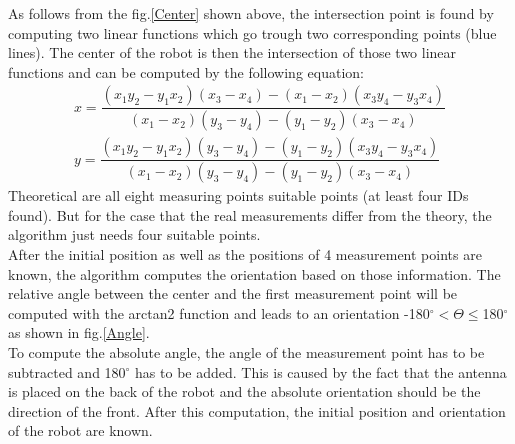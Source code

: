 As follows from the fig.\ref{Center} shown above, the intersection point is found by computing two linear functions which go trough two corresponding points (blue lines). The center of the robot is then the intersection of those two linear functions and can be computed by the following equation:
\begin{align}
x = \dfrac{(x_1y_2-y_1x_2)(x_3-x_4)-(x_1-x_2)(x_3y_4-y_3x_4)}{(x_1-x_2)(y_3-y_4)-(y_1-y_2)(x_3-x_4)} \\
y = \dfrac{(x_1y_2-y_1x_2)(y_3-y_4)-(y_1-y_2)(x_3y_4-y_3x_4)}{(x_1-x_2)(y_3-y_4)-(y_1-y_2)(x_3-x_4)}
\end{align}
Theoretical are all eight measuring points suitable points (at least four IDs found). But for the case that the real measurements differ from the theory, the algorithm just needs four suitable points. \\
After the initial position as well as the positions of 4 measurement points are known, the algorithm computes the orientation based on those information. The relative angle between the center and the first measurement point will be computed with the arctan2 function and leads to an orientation -180$^\circ < \Theta \leq$180$^\circ$ as shown in fig.\ref{Angle}. \\
To compute the absolute angle, the angle of the measurement point has to be subtracted and 180$^\circ$ has to be added. This is caused by the fact that the antenna is placed on the back of the robot and the absolute orientation should be the direction of the front. After this computation, the initial position and orientation of the robot are known. \\

